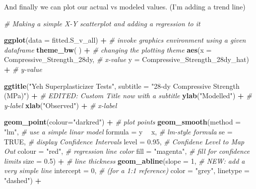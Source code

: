 \documentclass[]{article}
\newenvironment{Shaded}{\begin{snugshade}}{\end{snugshade}}
\newcommand{\CommentTok}[1]{\textcolor[rgb]{0.56,0.35,0.01}{\textit{#1}}}
\newcommand{\DataTypeTok}[1]{\textcolor[rgb]{0.13,0.29,0.53}{#1}}
\newcommand{\DecValTok}[1]{\textcolor[rgb]{0.00,0.00,0.81}{#1}}
\newcommand{\FloatTok}[1]{\textcolor[rgb]{0.00,0.00,0.81}{#1}}
\newcommand{\KeywordTok}[1]{\textcolor[rgb]{0.13,0.29,0.53}{\textbf{#1}}}
\newcommand{\NormalTok}[1]{#1}
\newcommand{\OperatorTok}[1]{\textcolor[rgb]{0.81,0.36,0.00}{\textbf{#1}}}
\newcommand{\OtherTok}[1]{\textcolor[rgb]{0.56,0.35,0.01}{#1}}
\newcommand{\StringTok}[1]{\textcolor[rgb]{0.31,0.60,0.02}{#1}}
\begin{document}
And finally we can plot our actual vs modeled values. (I'm adding a
trend line)

\begin{Shaded}
\begin{Highlighting}[]
\CommentTok{# Making a simple X-Y scatterplot and adding a regression to it}

\KeywordTok{ggplot}\NormalTok{(}\DataTypeTok{data =}\NormalTok{ fitted.S_v_all) }\OperatorTok{+}\StringTok{           }\CommentTok{# invoke graphics environment using a given dataframe}
\StringTok{  }
\StringTok{  }\KeywordTok{theme_bw}\NormalTok{( ) }\OperatorTok{+}\StringTok{                           }\CommentTok{# changing the plotting theme}
\StringTok{  }
\StringTok{  }\KeywordTok{aes}\NormalTok{(}\DataTypeTok{x      =}\NormalTok{ Compressive_Strength_28dy,    }\CommentTok{# x-value}
      \DataTypeTok{y      =}\NormalTok{ Compressive_Strength_28dy_hat) }\OperatorTok{+}\StringTok{  }\CommentTok{# y-value}

\StringTok{  }\KeywordTok{ggtitle}\NormalTok{(}\StringTok{"Yeh Superplasticizer Tests"}\NormalTok{,}
          \DataTypeTok{subtitle =} \StringTok{"28-dy Compressive Strength (MPa)"}\NormalTok{) }\OperatorTok{+}\StringTok{    }\CommentTok{# EDITED: Custom Title now with a subtitle}
\StringTok{  }
\StringTok{  }\KeywordTok{ylab}\NormalTok{(}\StringTok{"Modelled"}\NormalTok{)     }\OperatorTok{+}\StringTok{ }\CommentTok{# y-label}
\StringTok{  }\KeywordTok{xlab}\NormalTok{(}\StringTok{"Observed"}\NormalTok{)     }\OperatorTok{+}\StringTok{ }\CommentTok{# x-label}

\StringTok{  }\KeywordTok{geom_point}\NormalTok{(}\DataTypeTok{colour=}\StringTok{"darkred"}\NormalTok{) }\OperatorTok{+}\StringTok{  }\CommentTok{# plot points}
\StringTok{  }
\StringTok{  }\KeywordTok{geom_smooth}\NormalTok{(}\DataTypeTok{method  =} \StringTok{"lm"}\NormalTok{,      }\CommentTok{# use a simple linar model}
              \DataTypeTok{formula =}\NormalTok{ y }\OperatorTok{~}\StringTok{ }\NormalTok{x,     }\CommentTok{# lm-style formula}
              \DataTypeTok{se      =} \OtherTok{TRUE}\NormalTok{,      }\CommentTok{# display Confidence Intervals}
              \DataTypeTok{level   =} \FloatTok{0.95}\NormalTok{,      }\CommentTok{# Confidene Level to Map Out}
              \DataTypeTok{colour  =} \StringTok{"red"}\NormalTok{,     }\CommentTok{# regression line color}
              \DataTypeTok{fill    =} \StringTok{"magenta"}\NormalTok{, }\CommentTok{# fill for confidence limits}
              \DataTypeTok{size    =} \FloatTok{0.5}\NormalTok{)  }\OperatorTok{+}\StringTok{    }\CommentTok{# line thickness}
\StringTok{  }
\StringTok{  }\KeywordTok{geom_abline}\NormalTok{(}\DataTypeTok{slope     =} \DecValTok{1}\NormalTok{,       }\CommentTok{# NEW: add a very simple line}
              \DataTypeTok{intercept =} \DecValTok{0}\NormalTok{,       }\CommentTok{#  (for a 1:1 reference)}
              \DataTypeTok{color     =} \StringTok{"grey"}\NormalTok{,}
              \DataTypeTok{linetype  =} \StringTok{"dashed"}\NormalTok{) }\OperatorTok{+}


\end{Highlighting}
\end{Shaded}
\end{document}
